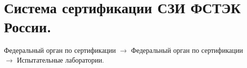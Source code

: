 \section{Система сертификации СЗИ ФСТЭК России.}

Федеральный орган по сертификации $\rightarrow$ Федеральный орган по сертификации $\rightarrow$ Испытательные лаборатории.